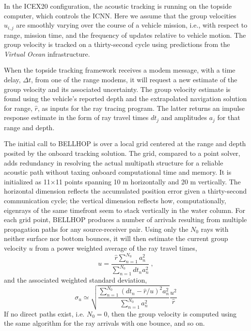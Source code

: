  In the ICEX20 configuration, the acoustic tracking is running on the topside computer, which controls the ICNN.
Here we assume that the group velocities $u_{i,j}$ are smoothly varying over the course of a vehicle mission, i.e., with respect to range, mission time, and the frequency of updates relative to vehicle motion. 
The group velocity is tracked on a thirty-second cycle using predictions from the \textit{Virtual Ocean} infrastructure.

 When the topside tracking framework receives a modem message, with a time delay, $\Delta t$, from one of the range modems, it will request a new estimate of the group velocity and its associated uncertainty.
The group velocity estimate is found using the vehicle's reported depth and the extrapolated navigation solution for range, $\hat{r}$, as inputs for the ray tracing program.
The latter returns an impulse response estimate in the form of ray travel times $dt_{j}$ and amplitudes $a_{j}$ for that range and depth.

 The initial call to BELLHOP is over a local grid centered at the range and depth posited by the onboard tracking solution.
The grid, compared to a point solver, adds redundancy in resolving the actual multipath structure for a reliable acoustic path without taxing onboard computational time and memory.
It is initialized as 11$\times$11 points spanning 10 m horizontally and 20 m vertically.
The horizontal dimension reflects the accumulated position error given a thirty-second communication cycle; the vertical dimension reflects how, computationally, eigenrays of the same timefront seem to stack vertically in the water column. 
For each grid point, BELLHOP produces a number of arrivals resulting from multiple propagation paths for any source-receiver pair.
Using only the $N_0$ rays with neither surface nor bottom bounces, it will then estimate the current group velocity $u$ from a power weighted average of the ray travel times,
\begin{equation}
u = \frac{\hat{r} \sum_{n=1}^{N_{0}} a_{n}^{2}}{\sum_{n=1}^{N_{0}} dt_{n}a_{n}^{2}} ~, 
\end{equation}
and the associated weighted standard deviation,
\begin{equation}
\sigma_{u} \simeq \sqrt{\frac {\sum_{n=1}^{N_{0}} (dt_{n}-\hat{r}/u)^{2}a_{n}^{2}}{ \sum_{n=1}^{N_{0}} a_{n}^{2}} } \frac{u^{2}}{\hat{r}}
\end{equation}
If no direct paths exist, i.e. $N_{0}=0$, then the group velocity is computed using the same algorithm for the ray arrivals with one bounce, and so on.

